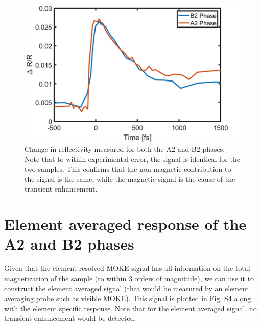 \begin{figure}[htbp]
	\begin{center}
		\includegraphics[width=150mm]{figs/ReflectivityHeusler}
	\end{center}
	\caption{Change in reflectivity measured for both the A2 and B2 phases. Note that to within experimental error, the signal is identical for the two samples. This confirms that the non-magnetic contribution to the signal is the same, while the magnetic signal is the cause of the transient enhancement.}
	\label{fig: ReflectivityHeusler}
\end{figure}

\section{Element averaged response of the A2 and B2 phases}
Given that the element resolved MOKE signal has all information on the total magnetization of the sample (to within 3 orders of magnitude), we can use it to construct the element averaged signal (that would be measured by an element averaging probe such as visible MOKE). This signal is plotted in Fig. S4 along with the element specific response. Note that for the element averaged signal, no transient enhancement would be detected.

